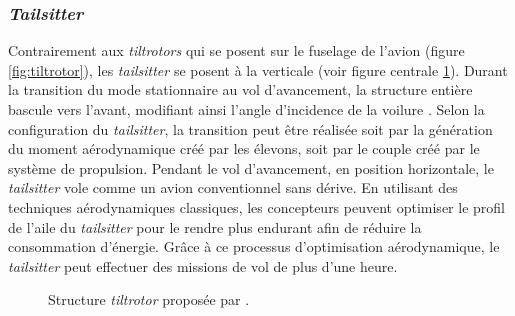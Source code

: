         \subsubsection*{\textit{Tailsitter}}
        Contrairement aux \textit{tiltrotors} qui se posent sur le fuselage de l'avion (figure \ref{fig:tiltrotor}), les \textit{tailsitter} se posent à la verticale (voir figure centrale \ref{fig:tailsitter}). Durant la transition du mode stationnaire au vol d'avancement, la structure entière bascule vers l'avant, modifiant ainsi l'angle d'incidence de la voilure \cite{RobinRaffaello2017, VerlingWeibelSiegwart2016,smeurINDITail, ChiappinelliNahon2018, tal2022global}. Selon la configuration du \textit{tailsitter}, la transition peut être réalisée soit par la génération du moment aérodynamique créé par les élevons, soit par le couple créé par le système de propulsion. Pendant le vol d'avancement, en position horizontale, le \textit{tailsitter} vole comme un avion conventionnel sans dérive. En utilisant des techniques aérodynamiques classiques, les concepteurs peuvent optimiser le profil de l'aile du \textit{tailsitter} pour le rendre plus endurant afin de réduire la consommation d'énergie. Grâce à ce processus d'optimisation aérodynamique, le \textit{tailsitter} peut effectuer des missions de vol de plus d'une heure.

        \begin{figure}[ht!]
            \centering
            \caption{Structure \textit{tiltrotor}  proposée par \cite{smeurINDITail,fernandez:hal-04612206,pflimlin:tel-00132352}.}
            \label{fig:tailsitter}
        \end{figure}
        
